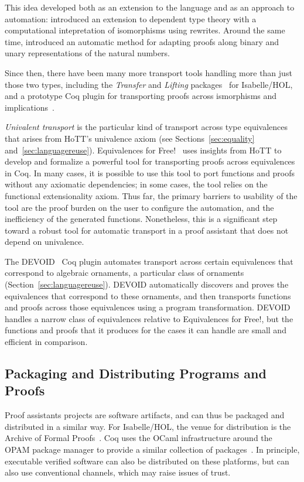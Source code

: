 This idea developed both as an extension to the language and as an approach
to automation: \cite{Barthe2001} introduced an extension to dependent
type theory with a computational intepretation of isomorphisms using
rewrites. Around the same time, \cite{Magaud2002} introduced an
automatic method for adapting proofs along binary and unary
representations of the natural numbers.

Since then, there have been many more transport tools handling more than just those two types,
including the \textit{Transfer} and \textit{Lifting} packages~\citep{Huffman2013} for Isabelle/HOL,
and a prototype Coq plugin for transporting proofs across ismorphisms and implications~\citep{ZimmermannH15}.

\textit{Univalent transport} is the particular kind of transport across type equivalences that arises
from HoTT's univalence axiom (see Sections~\ref{sec:equality} and~\ref{sec:languagereuse}).
Equivalences for Free!~\citep{tabareau2018} uses insights from HoTT
to develop and formalize a powerful tool for transporting proofs across equivalences in Coq.
In many cases, it is possible to use this tool to port functions and proofs without any axiomatic dependencies;
in some cases, the tool relies on the functional extensionality axiom.
Thus far, the primary barriers to usability of the tool are the proof burden on the user to configure the automation,
and the inefficiency of the generated functions. Nonetheless, this is a significant step toward
a robust tool for automatic transport in a proof assistant that does not depend on univalence.

The \textsc{DEVOID}~\citep{Ringer2019} Coq plugin automates transport across certain equivalences
that correspond to algebraic ornaments, a particular class of ornaments (Section~\ref{sec:languagereuse}).
\textsc{DEVOID} automatically discovers and proves the equivalences that correspond to these ornaments,
and then transports functions and proofs across those equivalences using a program transformation. \textsc{DEVOID} handles a narrow class of equivalences
relative to Equivalences for Free!, but the functions and proofs that it produces for the cases it can handle are small and efficient in comparison.

\subsection{Packaging and Distributing Programs and Proofs}

Proof assistants projects are software artifacts, and can thus be packaged and distributed in a similar way.
For Isabelle/HOL, the venue for distribution is the Archive of Formal Proofs~\citep{isabelleafp,Blanchette2015}.
Coq uses the OCaml infrastructure around the OPAM package manager to provide a similar collection of packages~\citep{CoqOPAM}.
In principle, executable verified software can also be distributed on these platforms, but can also
use conventional channels, which may raise issues of trust.

